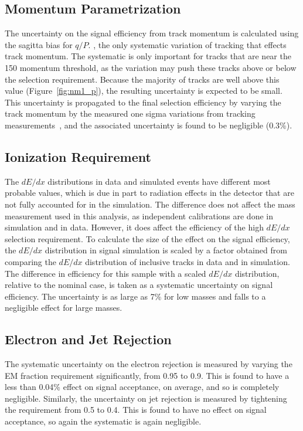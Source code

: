 \subsection{Momentum Parametrization}
The uncertainty on the signal efficiency from track momentum is calculated using the sagitta bias for $q/P$. , the only systematic variation of tracking that effects track momentum.
The systematic is only important for tracks that are near the 150 \GeV momentum threshold, as the variation may push these tracks above or below the selection requirement.
Because the majority of \rhadron tracks are well above this value (Figure~\ref{fig:nm1_p}), the resulting uncertainty is expected to be small.
This uncertainty is propagated to the final selection efficiency by varying the track momentum by the measured one sigma variations from tracking measurements~\cite{ATL-PHYS-PUB-2015-051}, and the associated uncertainty is found to be negligible (0.3\%). 

\subsection{Ionization Requirement}
The $dE/dx$ distributions in data and simulated events have different most probable values, which is due in part to radiation effects in the detector that are not fully accounted for in the simulation. 
The difference does not affect the mass measurement used in this analysis, as independent calibrations are done in simulation and in data. 
However, it does affect the efficiency of the high $dE/dx$ selection requirement. 
To calculate the size of the effect on the signal efficiency, the $dE/dx$ distribution in signal simulation is scaled by a factor obtained from comparing the $dE/dx$ distribution of inclusive tracks in data and in simulation. 
The difference in efficiency for this sample with a scaled $dE/dx$ distribution, relative to the nominal case, is taken as a systematic uncertainty on signal efficiency.
The uncertainty is as large as 7\% for low masses and falls to a negligible effect for large masses. 

\subsection{Electron and Jet Rejection}
The systematic uncertainty on the electron rejection is measured by varying the EM fraction requirement significantly, from 0.95 to 0.9. 
This is found to have a less than 0.04\% effect on signal acceptance, on average, and so is completely negligible. Similarly, the uncertainty on jet rejection is measured by tightening the \ep requirement from 0.5 to 0.4. 
This is found to have no effect on signal acceptance, so again the systematic is again negligible.

